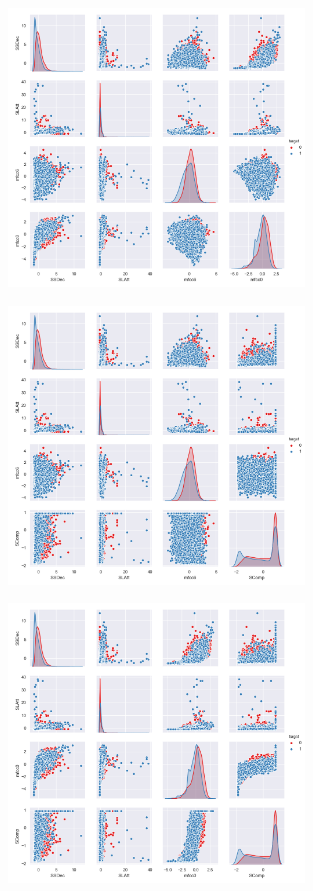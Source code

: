 \begin{figure}[h]
\centering
\includegraphics[width=0.7\textwidth]{output/figure_4.png}
\end{figure}
\begin{figure}[h]
\centering
\includegraphics[width=0.7\textwidth]{output/figure_5.png}
\end{figure}
\begin{figure}[h]
\centering
\includegraphics[width=0.7\textwidth]{output/figure_6.png}
\end{figure}
